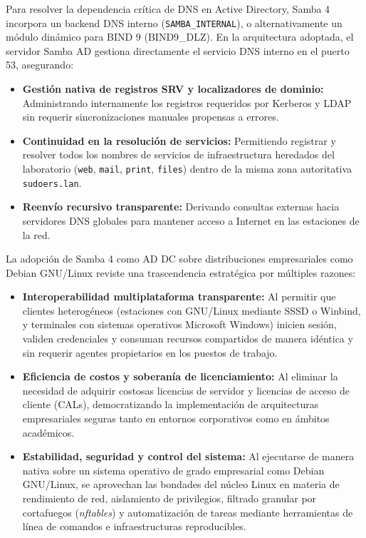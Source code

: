 Para resolver la dependencia crítica de DNS en Active Directory, Samba 4 incorpora un backend DNS interno (\texttt{SAMBA\_INTERNAL}), o alternativamente un módulo dinámico para BIND 9 (BIND9\_DLZ). En la arquitectura adoptada, el servidor Samba AD gestiona directamente el servicio DNS interno en el puerto 53, asegurando:
\begin{itemize}
    \item \textbf{Gestión nativa de registros SRV y localizadores de dominio:} Administrando internamente los registros requeridos por Kerberos y LDAP sin requerir sincronizaciones manuales propensas a errores.
    \item \textbf{Continuidad en la resolución de servicios:} Permitiendo registrar y resolver todos los nombres de servicios de infraestructura heredados del laboratorio (\texttt{web}, \texttt{mail}, \texttt{print}, \texttt{files}) dentro de la misma zona autoritativa \texttt{sudoers.lan}.
    \item \textbf{Reenvío recursivo transparente:} Derivando consultas externas hacia servidores DNS globales para mantener acceso a Internet en las estaciones de la red.
\end{itemize}

La adopción de Samba 4 como AD DC sobre distribuciones empresariales como Debian GNU/Linux reviste una trascendencia estratégica por múltiples razones:
\begin{itemize}
    \item \textbf{Interoperabilidad multiplataforma transparente:} Al permitir que clientes heterogéneos (estaciones con GNU/Linux mediante SSSD o Winbind, y terminales con sistemas operativos Microsoft Windows) inicien sesión, validen credenciales y consuman recursos compartidos de manera idéntica y sin requerir agentes propietarios en los puestos de trabajo.
    \item \textbf{Eficiencia de costos y soberanía de licenciamiento:} Al eliminar la necesidad de adquirir costosas licencias de servidor y licencias de acceso de cliente (CALs), democratizando la implementación de arquitecturas empresariales seguras tanto en entornos corporativos como en ámbitos académicos.
    \item \textbf{Estabilidad, seguridad y control del sistema:} Al ejecutarse de manera nativa sobre un sistema operativo de grado empresarial como Debian GNU/Linux, se aprovechan las bondades del núcleo Linux en materia de rendimiento de red, aislamiento de privilegios, filtrado granular por cortafuegos (\textit{nftables}) y automatización de tareas mediante herramientas de línea de comandos e infraestructuras reproducibles.
\end{itemize}

